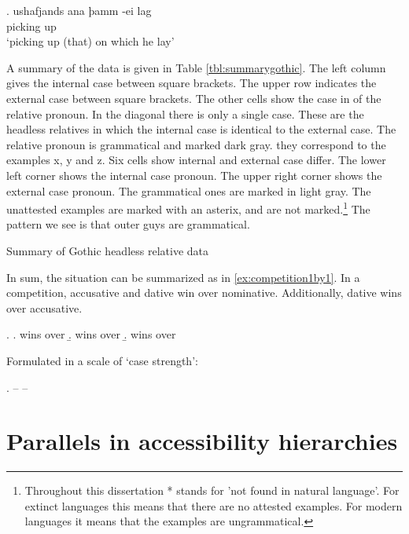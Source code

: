 \exg. ushafjands ana þamm -ei lag\\
 {picking up}\scsub{[acc]}    \\
 `picking up (that) on which he lay' \label{ex:gothicaccdatrep}

A summary of the data is given in Table \ref{tbl:summarygothic}. The left column gives the internal case between square brackets. The upper row indicates the external case between square brackets.
The other cells show the case in of the relative pronoun. In the diagonal there is only a single case. These are the headless relatives in which the internal case is identical to the external case. The relative pronoun is grammatical and marked dark gray. they correspond to the examples x, y and z.
Six cells show internal and external case differ. The lower left corner shows the internal case pronoun. The upper right corner shows the external case pronoun. The grammatical ones are marked in light gray. The unattested examples are marked with an asterix, and are not marked.\footnote{
Throughout this dissertation * stands for 'not found in natural language'. For extinct languages this means that there are no attested examples. For modern languages it means that the examples are ungrammatical.
}
The pattern we see is that outer guys are grammatical.


\begin{table}[H]
  \center
  \caption {Summary of Gothic headless relative data}
    
    \label{tbl:summarygothic}
\end{table}


In sum, the situation can be summarized as in \ref{ex:competition1by1}. In a competition, accusative and dative win over nominative. Additionally, dative wins over accusative.

\ex.\label{ex:competition1by1}
\a.  wins over 
\b.  wins over 
\b.  wins over 

Formulated in a scale of `case strength':

\ex.  --  -- \label{ex:casestrength}




\section{Parallels in accessibility hierarchies}




